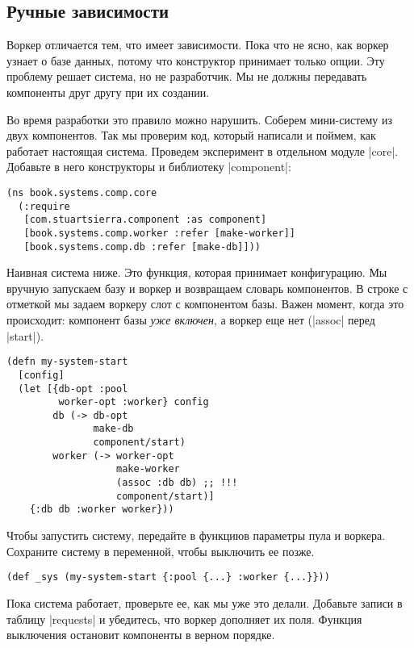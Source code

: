 \subsection{Ручные зависимости}

Воркер отличается тем, что имеет зависимости. Пока что не ясно, как воркер
узнает о базе данных, потому что конструктор принимает только опции. Эту
проблему решает система, но не разработчик. Мы не должны передавать компоненты
друг другу при их создании.

Во время разработки это правило можно нарушить. Соберем мини-систему из двух
компонентов. Так мы проверим код, который написали и поймем, как работает
настоящая система. Проведем эксперимент в отдельном модуле
\spverb|core|. Добавьте в него конструкторы и библиотеку \spverb|component|:

\begin{verbatim}
(ns book.systems.comp.core
  (:require
   [com.stuartsierra.component :as component]
   [book.systems.comp.worker :refer [make-worker]]
   [book.systems.comp.db :refer [make-db]]))
\end{verbatim}

Наивная система ниже. Это функция, которая принимает конфигурацию. Мы вручную
запускаем базу и воркер и возвращаем словарь компонентов. В строке с отметкой мы
задаем воркеру слот с компонентом базы. Важен момент, когда это происходит:
компонент базы \emph{уже включен}, а воркер еще нет (\spverb|assoc| перед
\spverb|start|).

\begin{verbatim}
(defn my-system-start
  [config]
  (let [{db-opt :pool
         worker-opt :worker} config
        db (-> db-opt
               make-db
               component/start)
        worker (-> worker-opt
                   make-worker
                   (assoc :db db) ;; !!!
                   component/start)]
    {:db db :worker worker}))
\end{verbatim}

Чтобы запустить систему, передайте в функциюв параметры пула и
воркера. Сохраните систему в переменной, чтобы выключить ее позже.

\begin{verbatim}
(def _sys (my-system-start {:pool {...} :worker {...}}))
\end{verbatim}

Пока система работает, проверьте ее, как мы уже это делали. Добавьте записи в
таблицу \spverb|requests| и убедитесь, что воркер дополняет их поля. Функция
выключения остановит компоненты в верном порядке.

